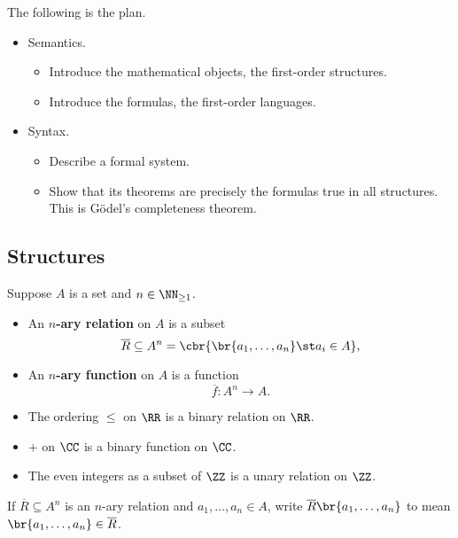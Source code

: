 The following is the plan.
\begin{itemize}
\item Semantics.
\begin{itemize}
\item Introduce the mathematical objects, the first-order structures.
\item Introduce the formulas, the first-order languages.
\end{itemize}
\item Syntax.
\begin{itemize}
\item Describe a formal system.
\item Show that its theorems are precisely the formulas true in all structures. This is G\"odel's completeness theorem.
\end{itemize}
\end{itemize}

\subsection{Structures}

\begin{definition}
Suppose $ A $ is a set and $ n \in \NN_{\ge 1} $.
\begin{itemize}
\item An \textbf{$ n $-ary relation} on $ A $ is a subset
$$ \overline{R} \subseteq A^n = \cbr{\br{a_1, \dots, a_n} \st a_i \in A}, $$
\item An \textbf{$ n $-ary function} on $ A $ is a function
$$ \overline{f} : A^n \to A. $$
\end{itemize}
\end{definition}

\begin{example*}
\hfill
\begin{itemize}
\item The ordering $ \le $ on $ \RR $ is a binary relation on $ \RR $.
\item $ + $ on $ \CC $ is a binary function on $ \CC $.
\item The even integers as a subset of $ \ZZ $ is a unary relation on $ \ZZ $.
\end{itemize}
\end{example*}

\begin{notation*}
If $ \overline{R} \subseteq A^n $ is an $ n $-ary relation and $ a_1, \dots, a_n \in A $, write $ \overline{R}\br{a_1, \dots, a_n} $ to mean $ \br{a_1, \dots, a_n} \in \overline{R} $.
\end{notation*}

